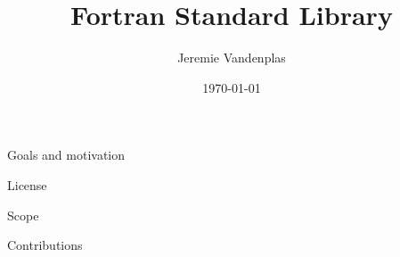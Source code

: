 \documentclass{beamer}
\title{Fortran Standard Library}
\author{Jeremie Vandenplas}
\institute{Wageningen University and Research}
\date{\today}
\begin{document}
\begin{frame}[t]
	\titlepage
\end{frame}	

\begin{frame}[t]{Goals and motivation}
	
\end{frame}

\begin{frame}[t]{License}
	
\end{frame}

\begin{frame}[t]{Scope}
	
\end{frame}

\begin{frame}[t]{Contributions}
	
\end{frame}
\end{document}

